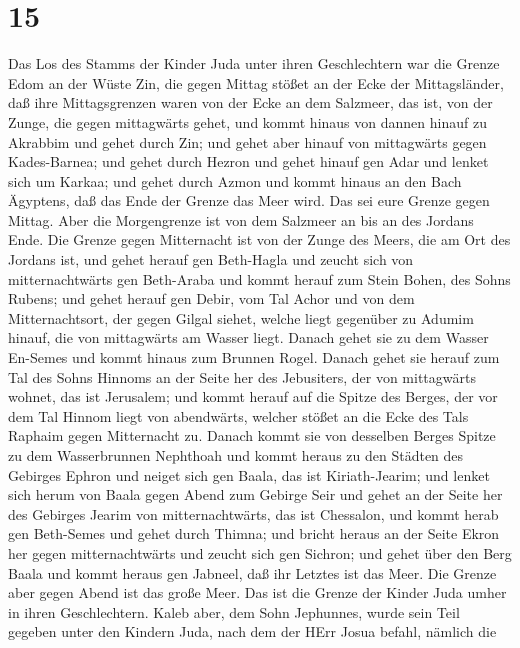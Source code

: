 \hypertarget{section-14}{%
\section{15}\label{section-14}}

 Das Los des Stamms der Kinder Juda unter ihren
Geschlechtern war die Grenze Edom an der Wüste Zin, die gegen Mittag
stößet an der Ecke der Mittagsländer,  daß ihre
Mittagsgrenzen waren von der Ecke an dem Salzmeer, das ist, von der
Zunge, die gegen mittagwärts gehet,  und kommt hinaus von
dannen hinauf zu Akrabbim und gehet durch Zin; und gehet aber hinauf von
mittagwärts gegen Kades-Barnea; und gehet durch Hezron und gehet hinauf
gen Adar und lenket sich um Karkaa;  und gehet durch Azmon
und kommt hinaus an den Bach Ägyptens, daß das Ende der Grenze das Meer
wird. Das sei eure Grenze gegen Mittag.  Aber die
Morgengrenze ist von dem Salzmeer an bis an des Jordans Ende. Die Grenze
gegen Mitternacht ist von der Zunge des Meers, die am Ort des Jordans
ist,  und gehet herauf gen Beth-Hagla und zeucht sich von
mitternachtwärts gen Beth-Araba und kommt herauf zum Stein Bohen, des
Sohns Rubens;  und gehet herauf gen Debir, vom Tal Achor und
von dem Mitternachtsort, der gegen Gilgal siehet, welche liegt gegenüber
zu Adumim hinauf, die von mittagwärts am Wasser liegt. Danach gehet sie
zu dem Wasser En-Semes und kommt hinaus zum Brunnen Rogel. 
Danach gehet sie herauf zum Tal des Sohns Hinnoms an der Seite her des
Jebusiters, der von mittagwärts wohnet, das ist Jerusalem; und kommt
herauf auf die Spitze des Berges, der vor dem Tal Hinnom liegt von
abendwärts, welcher stößet an die Ecke des Tals Raphaim gegen
Mitternacht zu.  Danach kommt sie von desselben Berges
Spitze zu dem Wasserbrunnen Nephthoah und kommt heraus zu den Städten
des Gebirges Ephron und neiget sich gen Baala, das ist Kiriath-Jearim;
 und lenket sich herum von Baala gegen Abend zum Gebirge
Seir und gehet an der Seite her des Gebirges Jearim von
mitternachtwärts, das ist Chessalon, und kommt herab gen Beth-Semes und
gehet durch Thimna;  und bricht heraus an der Seite Ekron
her gegen mitternachtwärts und zeucht sich gen Sichron; und gehet über
den Berg Baala und kommt heraus gen Jabneel, daß ihr Letztes ist das
Meer.  Die Grenze aber gegen Abend ist das große Meer. Das
ist die Grenze der Kinder Juda umher in ihren Geschlechtern.
 Kaleb aber, dem Sohn Jephunnes, wurde sein Teil gegeben
unter den Kindern Juda, nach dem der HErr Josua befahl, nämlich die
